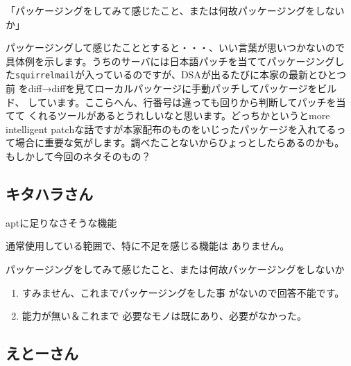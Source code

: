 \documentclass[cjk,dvipdfmx]{beamer}
\begin{document}
\begin{frame}{「パッケージングをしてみて感じたこと、または何故パッケージングをしないか」}

 パッケージングして感じたこととすると・・・、いい言葉が思いつかないので
 具体例を示します。うちのサーバには日本語パッチを当ててパッケージングし
 た\texttt{squirrelmail}が入っているのですが、DSAが出るたびに本家の最新とひとつ前
 をdiff→diffを見てローカルパッケージに手動パッチしてパッケージをビルド、
 しています。ここらへん、行番号は違っても回りから判断してパッチを当てて
 くれるツールがあるとうれしいなと思います。どっちかというとmore
 intelligent patchな話ですが本家配布のものをいじったパッケージを入れてるっ
 て場合に重要な気がします。調べたことないからひょっとしたらあるのかも。
 もしかして今回のネタそのもの？
\end{frame}

\subsection{キタハラさん}

\begin{frame}
 {aptに足りなさそうな機能}

 通常使用している範囲で、特に不足を感じる機能は
 ありません。
\end{frame}

\begin{frame}{パッケージングをしてみて感じたこと、または何故パッケージングをしないか}

 \begin{enumerate}
 \item  すみません、これまでパッケージングをした事
 がないので回答不能です。　

 \item  能力が無い＆これまで
 必要なモノは既にあり、必要がなかった。
 \end{enumerate}
\end{frame}

\subsection{えとーさん}
\end{document}
